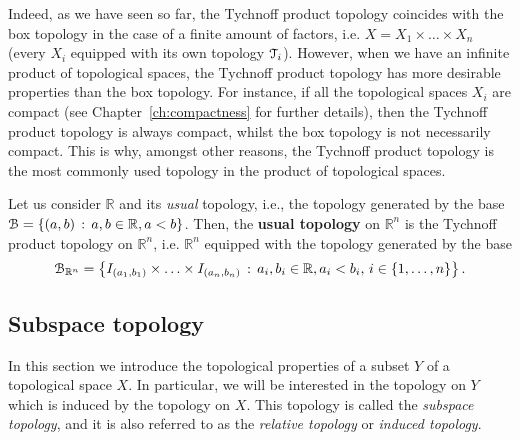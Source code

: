 Indeed, as we have seen so far, the Tychnoff product topology coincides with the box topology
in the case of a finite amount of factors, i.e. $X=X_1\times\ldots\times X_n$ (every
$X_i$ equipped with its own topology $\EuScript{T}_i$). However, when we have an infinite product
of topological spaces, the Tychnoff product topology has more desirable properties than
the box topology. For instance, if all the topological spaces $X_i$ are compact (see Chapter~\ref{ch:compactness}
for further details), then the Tychnoff product topology is always compact, whilst the
box topology is not necessarily compact. This is why, amongst other reasons, the Tychnoff
product topology is the most commonly used topology in the product of topological spaces.

\begin{definition}\label{def:usual-topology}
	Let us consider $\mathbb{R}$ and its \emph{usual} topology, i.e., the topology generated
	by the base $\EuScript{B}=\left\{(a,b)\,:\,a,b\in\mathbb{R}, a<b\right\}$.
	Then, the \textbf{usual topology} on $\mathbb{R}^n$ is the Tychnoff product topology
	on $\mathbb{R}^n$, i.e. $\mathbb{R}^n$ equipped with the topology generated by the base
	$$
		\EuScript{B}_{\mathbb{R}^n}=\left\{I_{(a_1,b_1)}\times\ldots\times I_{(a_n,b_n)}\,:\,a_i,b_i\in\mathbb{R}, a_i<b_i,\,i\in\{1,\ldots,n\}\right\}.
	$$
\end{definition}

\subsection{Subspace topology}\label{subsec:subspace-topology}

In this section we introduce the topological properties of a subset $Y$ of a
topological space $X$. In particular, we will be interested in the topology on $Y$
which is induced by the topology on $X$. This topology is called the \emph{subspace topology},
and it is also referred to as the \emph{relative topology} or \emph{induced topology}.


